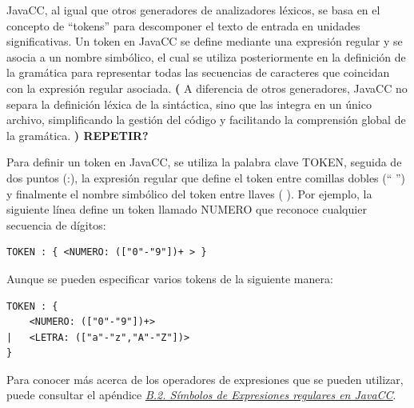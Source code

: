 

JavaCC, al igual que otros generadores de analizadores léxicos, se basa en el concepto de ``tokens'' para descomponer el texto de entrada en unidades significativas. Un token en JavaCC se define mediante una expresión regular y se asocia a un nombre simbólico, el cual se utiliza posteriormente en la definición de la gramática para representar todas las secuencias de caracteres que coincidan con la expresión regular asociada. \textbf{(} A diferencia de otros generadores, JavaCC no separa la definición léxica de la sintáctica, sino que las integra en un único archivo, simplificando la gestión del código y facilitando la comprensión global de la gramática. \textbf{) REPETIR?}

Para definir un token en JavaCC, se utiliza la palabra clave TOKEN, seguida de dos puntos (:), la expresión regular que define el token entre comillas dobles (`` '') y finalmente el nombre simbólico del token entre llaves ({ }). Por ejemplo, la siguiente línea define un token llamado NUMERO que reconoce cualquier secuencia de dígitos:

\lstset{inputencoding=utf8/latin1}
\begin{lstlisting}
TOKEN : { <NUMERO: (["0"-"9"])+ > } 
\end{lstlisting}

Aunque se pueden especificar varios tokens de la siguiente manera:

\lstset{inputencoding=utf8/latin1}
\begin{lstlisting}
TOKEN : {
	<NUMERO: (["0"-"9"])+>
|	<LETRA: (["a"-"z","A"-"Z"])>
}
\end{lstlisting}

Para conocer más acerca de los operadores de expresiones que se pueden utilizar, puede consultar el apéndice \hyperref[sec:simbolosdeexpresionesregulares]{\textit{B.2. Símbolos de Expresiones regulares en JavaCC}}.

